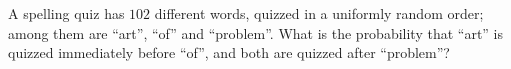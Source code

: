 A spelling quiz has $102$ different words, quizzed in a uniformly random order; among them are ``art'', ``of'' and ``problem''. What is the probability that ``art'' is quizzed immediately before ``of'', and both are quizzed after ``problem''?
